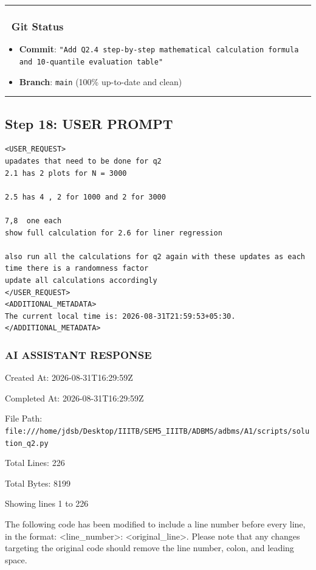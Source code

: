 \documentclass[11pt,a4paper]{article}
\begin{document}
\hrule


\subsubsection{🐙 Git Status}
\begin{itemize}
\item \textbf{Commit}: \texttt{"Add Q2.4 step-by-step mathematical calculation formula and 10-quantile evaluation table"}
\item \textbf{Branch}: \texttt{main} (100\% up-to-date and clean)
\end{itemize}

\hrule

\subsection{Step 18: USER PROMPT}

\begin{lstlisting}[language=text]
<USER_REQUEST>
upadates that need to be done for q2 
2.1 has 2 plots for N = 3000 

2.5 has 4 , 2 for 1000 and 2 for 3000

7,8  one each 
show full calculation for 2.6 for liner regression 

also run all the calculations for q2 again with these updates as each time there is a randomness factor 
update all calculations accordingly  
</USER_REQUEST>
<ADDITIONAL_METADATA>
The current local time is: 2026-08-31T21:59:53+05:30.
</ADDITIONAL_METADATA>
\end{lstlisting}


\subsubsection{AI ASSISTANT RESPONSE}

Created At: 2026-08-31T16:29:59Z

Completed At: 2026-08-31T16:29:59Z

File Path: \texttt{file:///home/jdsb/Desktop/IIITB/SEM5\_IIITB/ADBMS/adbms/A1/scripts/solution\_q2.py}

Total Lines: 226

Total Bytes: 8199

Showing lines 1 to 226

The following code has been modified to include a line number before every line, in the format: <line\_number>: <original\_line>. Please note that any changes targeting the original code should remove the line number, colon, and leading space.
\end{document}
